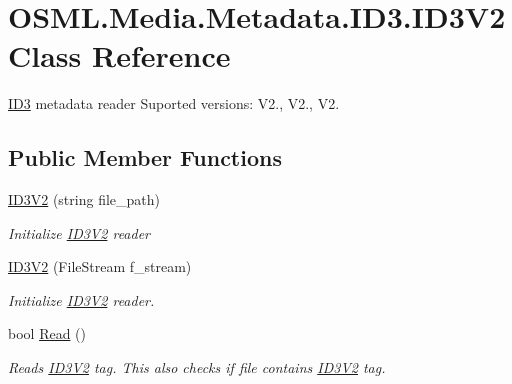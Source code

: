 \hypertarget{classOSML_1_1Media_1_1Metadata_1_1ID3_1_1ID3V2}{}\section{O\+S\+M\+L.\+Media.\+Metadata.\+I\+D3.\+I\+D3\+V2 Class Reference}
\label{classOSML_1_1Media_1_1Metadata_1_1ID3_1_1ID3V2}


\mbox{\hyperlink{namespaceOSML_1_1Media_1_1Metadata_1_1ID3}{I\+D3}} metadata reader Suported versions\+: V2., V2., V2.  


\subsection*{Public Member Functions}
\begin{DoxyCompactItemize}
\item 
\mbox{\hyperlink{classOSML_1_1Media_1_1Metadata_1_1ID3_1_1ID3V2_afb6c13b0cf95b443ab31d61296b0476a}{I\+D3\+V2}} (string file\+\_\+path)
\begin{DoxyCompactList}\small\item\em Initialize \mbox{\hyperlink{classOSML_1_1Media_1_1Metadata_1_1ID3_1_1ID3V2}{I\+D3\+V2}} reader \end{DoxyCompactList}\item 
\mbox{\hyperlink{classOSML_1_1Media_1_1Metadata_1_1ID3_1_1ID3V2_a87d53935968908a75c9e7afb5237e162}{I\+D3\+V2}} (File\+Stream f\+\_\+stream)
\begin{DoxyCompactList}\small\item\em Initialize \mbox{\hyperlink{classOSML_1_1Media_1_1Metadata_1_1ID3_1_1ID3V2}{I\+D3\+V2}} reader. \end{DoxyCompactList}\item 
bool \mbox{\hyperlink{classOSML_1_1Media_1_1Metadata_1_1ID3_1_1ID3V2_abd35232d1aee120b2f33ea7c8de65b76}{Read}} ()
\begin{DoxyCompactList}\small\item\em Reads \mbox{\hyperlink{classOSML_1_1Media_1_1Metadata_1_1ID3_1_1ID3V2}{I\+D3\+V2}} tag. This also checks if file contains \mbox{\hyperlink{classOSML_1_1Media_1_1Metadata_1_1ID3_1_1ID3V2}{I\+D3\+V2}} tag. \end{DoxyCompactList}\end{DoxyCompactItemize}
